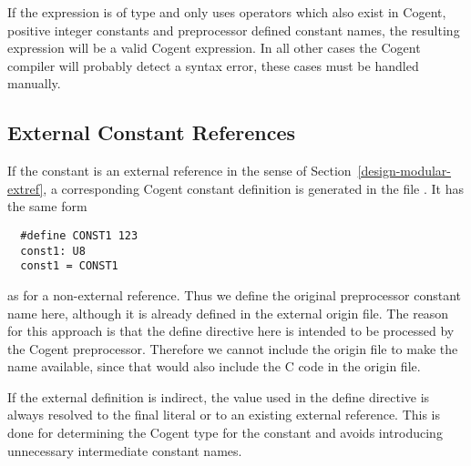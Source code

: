 If the expression is of type  and only uses operators which also exist in Cogent, positive integer constants 
and preprocessor defined constant names, the resulting expression will be a valid Cogent expression. In all other cases
the Cogent compiler will probably detect a syntax error, these cases must be handled manually.

\subsection{External Constant References}

If the constant  is an external reference in the sense of Section~\ref{design-modular-extref}, a corresponding
Cogent constant definition is generated in the file . It has the same form
\begin{verbatim}
  #define CONST1 123
  const1: U8
  const1 = CONST1
\end{verbatim}
as for a non-external reference. Thus we define the original preprocessor constant name  here, although
it is already defined in the external origin file. The reason for this approach is that the define directive here 
is intended to be processed by the Cogent preprocessor. Therefore we cannot include the origin file to make the name
available, since that would also include the C code in the origin file.

If the external definition is indirect, the value used in the define directive is always resolved to the final
literal or to an existing external reference. This is done for determining the Cogent type for the constant 
and avoids introducing unnecessary intermediate constant names.

